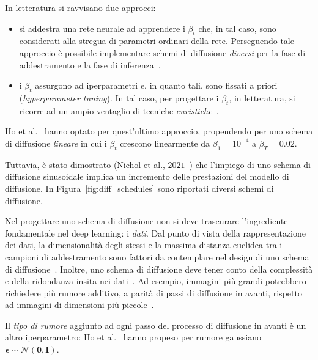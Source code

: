 \bigskip
\noindent In letteratura si ravvisano due approcci:
\begin{itemize}
\item si addestra una rete neurale ad apprendere i $\beta_t$ che, in tal caso, sono considerati alla stregua di 
parametri ordinari della rete.
Perseguendo tale approccio è possibile implementare schemi di diffusione \emph{diversi} per la fase di addestramento 
e la fase di inferenza~\cite{changDesignFundDiffusion2023}.
\item i $\beta_t$ assurgono ad iperparametri e, in quanto tali, sono fissati a priori (\emph{hyperparameter tuning}). In 
tal caso, per progettare i $\beta_t$, in letteratura, si ricorre ad un ampio ventaglio di tecniche \emph{euristiche}~\cite{changDesignFundDiffusion2023}.
\end{itemize}
Ho et al.~\cite{ho2020} hanno optato per quest'ultimo approccio, propendendo per uno schema di diffusione \emph{lineare} 
in cui i $\beta_t$ crescono linearmente da $\beta_1=10^{-4}$ a $\beta_T=0.02$.

Tuttavia, è stato dimostrato (Nichol et al., $2021$~\cite{nicholImprovedDenoisingDiffusion2021a}) 
che l'impiego di uno schema di diffusione sinusoidale implica un incremento delle prestazioni del modello di diffusione.
In Figura~\ref{fig:diff_schedules} sono riportati diversi schemi di diffusione.

Nel progettare uno schema di diffusione non si deve trascurare l'ingrediente fondamentale nel deep learning: i \emph{dati}.
Dal punto di vista della rappresentazione dei dati, la dimensionalità degli stessi e la massima distanza euclidea tra i campioni di addestramento 
sono fattori da contemplare nel design di uno schema di diffusione~\cite{songImprovedTechniquesTraining2020}. Inoltre, uno schema di diffusione deve 
tener conto della complessità e della ridondanza insita nei dati~\cite{chenImportanceNoiseScheduling2023}. Ad esempio, immagini più grandi potrebbero richiedere più 
rumore additivo, a parità di passi di diffusione in avanti, rispetto ad immagini di dimensioni più piccole~\cite{nicholImprovedDenoisingDiffusion2021a}.

Il \emph{tipo di rumore} aggiunto ad ogni passo del processo di diffusione in avanti è un altro iperparametro: Ho et al.~\cite{ho2020} hanno propeso 
per rumore gaussiano $\bm{\epsilon}\sim\mathcal{N}(\bm{0},\bm{I})$. 
